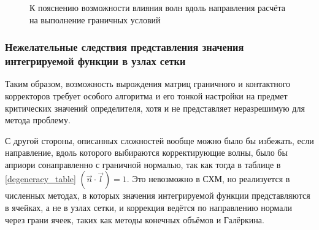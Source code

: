 \begin{figure}[H]
	\caption{К пояснению возможности влияния волн вдоль направления расчёта на выполнение граничных условий}
	\label{pic:fixed-normal-velocity}
\end{figure}


\subsubsection{Нежелательные следствия представления значения интегрируемой функции в узлах сетки}
\label{nodes_vs_cells}
Таким образом, возможность вырождения матриц граничного и контактного корректоров 
требует особого алгоритма и его тонкой настройки на предмет критических значений определителя, 
хотя и не представляет неразрешимую для метода проблему. 

С другой стороны, описанных сложностей вообще можно было бы избежать, 
если направление, вдоль которого выбираются корректирующие волны, было бы априори 
сонаправленно с граничной нормалью, 
так как тогда в таблице в \ref{degeneracy_table} $(\vec{n} \cdot \vec{l}) = 1$. 
Это невозможно в СХМ, но реализуется в численных методах, 
в которых значения интегрируемой функции представляются 
в ячейках, а не в узлах сетки, и коррекция ведётся по направлению нормали через грани ячеек, 
таких как методы конечных объёмов и Галёркина. 

